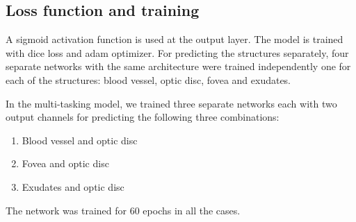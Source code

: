 \documentclass{article}
\begin{document}
\subsection{Loss function and training}\label{sec:loss_and_training}
A sigmoid activation function is used at the output layer.
The model is trained with dice loss and adam optimizer.
For predicting the structures separately, four separate networks with the same architecture were trained independently one for each of the structures: blood vessel, optic disc, fovea and exudates.

In the multi-tasking model, we trained three separate networks each with two output channels for predicting the following three combinations:
\begin{enumerate}
  \item Blood vessel and  optic disc
  \item Fovea and optic disc
  \item Exudates and optic disc
  \end{enumerate}

The network was trained for 60 epochs in all the cases.
\end{document}
